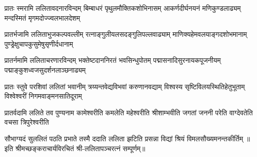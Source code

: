 
\fourlineindentedshloka
{प्रातः स्मरामि ललितावदनारविन्दम्}
{बिम्बाधरं पृथुलमौक्तिकशोभिनासम्}
{आकर्णदीर्घनयनं मणिकुण्डलाढ्यम्}
{मन्दस्मितं मृगमदोज्ज्वलभालदेशम्}

\fourlineindentedshloka
{प्रातर्भजामि ललिताभुजकल्पवल्लीम्}
{रत्नाङ्गुलीयलसदङ्गुलिपल्लवाढ्याम्}
{माणिक्यहेमवलयाङ्गदशोभमानाम्}
{पुण्ड्रेक्षुचापकुसुमेषुसृणीर्दधानाम्}

\fourlineindentedshloka
{प्रातर्नमामि ललिताचरणारविन्दम्}
{भक्तेष्टदाननिरतं भवसिन्धुपोतम्}
{पद्मासनादिसुरनायकपूजनीयम्}
{पद्माङ्कुशध्वजसुदर्शनलाञ्छनाढ्यम्}

\fourlineindentedshloka
{प्रातः स्तुवे परशिवां ललितां भवानीम्}
{त्रय्यन्तवेद्यविभवां करुणानवद्याम्}
{विश्वस्य सृष्टिविलयस्थितिहेतुभूताम्}
{विश्वेश्वरीं निगमवाङ्मनसातिदूराम्}

\fourlineindentedshloka
{प्रातर्वदामि ललिते तव पुण्यनाम}
{कामेश्वरीति कमलेति महेश्वरीति}
{श्रीशाम्भवीति जगतां जननी परेति}
{वाग्देवतेति वचसा त्रिपुरेश्वरीति}

{सौभाग्यदं सुललितं पठति प्रभाते}
{तस्मै ददाति ललिता झटिति प्रसन्ना}
{विद्यां श्रियं विमलसौख्यमनन्तकीर्तिम्}
॥इति श्रीमच्छङ्कराचार्यविरचितं  श्री-ललितापञ्चरत्नं सम्पूर्णम्॥